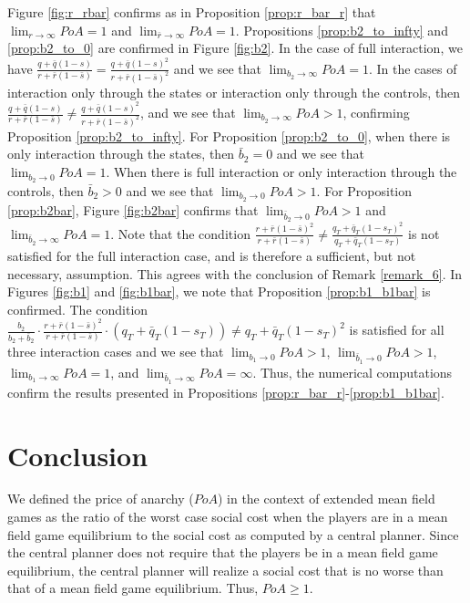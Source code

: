 \documentclass[11pt]{article}
\begin{document}
Figure \ref{fig:r_rbar} confirms as in Proposition \ref{prop:r_bar_r} that $\lim_{r \to \infty}PoA= 1$ and $\lim_{\bar{r} \to \infty}PoA= 1$. Propositions \ref{prop:b2_to_infty} and \ref{prop:b2_to_0} are confirmed in Figure \ref{fig:b2}. In the case of full interaction, we have $\frac{q + \bar{q}(1-s)}{r + \bar{r}(1-\bar{s})}= \frac{q + \bar{q}(1-s)^2}{r + \bar{r}(1-\bar{s})^2}$ and we see that $\lim_{b_2 \to \infty}PoA= 1$. In the cases of interaction only through the states or interaction only through the controls, then $\frac{q + \bar{q}(1-s)}{r + \bar{r}(1-\bar{s})}\neq \frac{q + \bar{q}(1-s)^2}{r + \bar{r}(1-\bar{s})^2}$, and we see that $\lim_{b_2 \to \infty}PoA> 1$, confirming Proposition \ref{prop:b2_to_infty}. For Proposition \ref{prop:b2_to_0}, when there is only interaction through the states, then $\bar{b}_2=0$ and we see that $\lim_{b_2 \to 0}PoA= 1$. When there is full interaction or only interaction through the controls, then $\bar{b}_2>0$ and we see that $\lim_{b_2 \to 0}PoA>1$. For Proposition \ref{prop:b2bar}, Figure \ref{fig:b2bar} confirms that $\lim_{\bar{b}_2 \to 0}PoA>1$ and $\lim_{\bar{b}_2 \to \infty}PoA= 1$. Note that the condition $\frac{r + \bar{r}(1- \bar{s})^2}{r + \bar{r}(1-\bar{s})} \neq \frac{q_T+\bar{q}_T(1-s_T)^2}{q_T+\bar{q}_T(1-s_T)}$ is not satisfied for the full interaction case, and is therefore a sufficient, but not necessary, assumption. This agrees with the conclusion of Remark \ref{remark_6}. In Figures \ref{fig:b1} and \ref{fig:b1bar}, we note that Proposition \ref{prop:b1_b1bar} is confirmed. The condition $\frac{b_2}{b_2+\bar{b}_2}\cdot \frac{r + \bar{r}(1- \bar{s})^2}{r + \bar{r}(1-\bar{s})}\cdot (q_T+\bar{q}_T(1-s_T)) \neq q_T+\bar{q}_T(1-s_T)^2$ is satisfied for all three interaction cases and we see that $\lim_{b_1 \to 0}PoA >1$, $\lim_{\bar{b}_1 \to 0}PoA>1$, $\lim_{b_1 \to \infty}PoA = 1$, and $\lim_{\bar{b}_1 \to \infty}PoA = \infty$. Thus, the numerical computations confirm the results presented in Propositions \ref{prop:r_bar_r}-\ref{prop:b1_b1bar}.

\section{\textbf{Conclusion}} \label{sec:conclusion}
We defined the price of anarchy ($PoA$) in the context of extended mean field games as the ratio of the worst case social cost when the players are in a mean field game equilibrium to the social cost as computed by a central planner. Since the central planner does not require that the players be in a mean field game equilibrium, the central planner will realize a social cost that is no worse than that of a mean field game equilibrium. Thus, $PoA \geq 1$.
\end{document}
